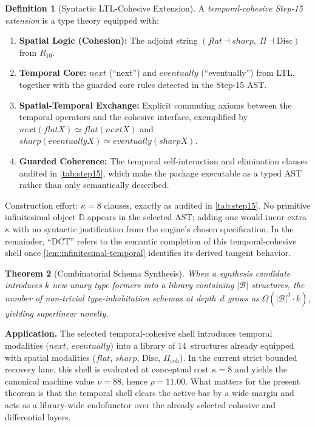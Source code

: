 \documentclass[11pt,a4paper]{article}
\def\flat{flat}%
\def\sharp{sharp}%
\def\bigcirc{next}%
\def\Diamond{eventually}%
\theoremstyle{plain}
\newtheorem{theorem}{Theorem}[section]
\theoremstyle{definition}
\newtheorem{definition}[theorem]{Definition}
\theoremstyle{remark}
\newcommand{\D}{\mathbb{D}}
\newcommand{\Disc}{\mathrm{Disc}}
\begin{document}
\begin{definition}[Syntactic LTL-Cohesive Extension]
\label{def:dct}
A \emph{temporal-cohesive Step-15 extension} is a type theory equipped with:
\begin{enumerate}[label=(\arabic*), nosep]
\item \textbf{Spatial Logic (Cohesion):} The adjoint string $(\flat \dashv \sharp,\; \Pi \dashv \Disc)$ from $R_{10}$.
\item \textbf{Temporal Core:} $\bigcirc$ (``next'') and $\Diamond$ (``eventually'') from LTL, together with the guarded core rules detected in the Step-15 AST.
\item \textbf{Spatial-Temporal Exchange:} Explicit commuting axioms between the temporal operators and the cohesive interface, exemplified by $\bigcirc(\flat X) \simeq \flat(\bigcirc X)$ and $\sharp(\Diamond X) \simeq \Diamond(\sharp X)$.
\item \textbf{Guarded Coherence:} The temporal self-interaction and elimination clauses audited in \cref{tab:step15}, which make the package executable as a typed AST rather than only semantically described.
\end{enumerate}
Construction effort: $\kappa = 8$ clauses, exactly as audited in \cref{tab:step15}.
No primitive infinitesimal object $\D$ appears in the selected AST; adding one would incur extra $\kappa$ with no syntactic justification from the engine's chosen specification.
In the remainder, ``DCT'' refers to the semantic completion of this temporal-cohesive shell once \cref{lem:infinitesimal-temporal} identifies its derived tangent behavior.
\end{definition}

\begin{theorem}[Combinatorial Schema Synthesis]
\label{thm:tensor}
When a synthesis candidate introduces $k$ new unary type formers into a library containing $|\mathcal{B}|$ structures, the number of non-trivial type-inhabitation schemas at depth~$d$ grows as $\Omega(|\mathcal{B}|^d \cdot k)$, yielding superlinear novelty.
\end{theorem}

\noindent \textbf{Application.}
The selected temporal-cohesive shell introduces temporal modalities ($\bigcirc$, $\Diamond$) into a library of 14~structures already equipped with spatial modalities ($\flat$, $\sharp$, $\Disc$, $\Pi_{\mathrm{coh}}$).
In the current strict bounded recovery lane, this shell is evaluated at conceptual cost $\kappa=8$ and yields the canonical machine value $\nu = 88$, hence $\rho = 11.00$.
What matters for the present theorem is that the temporal shell clears the active bar by a wide margin and acts as a library-wide endofunctor over the already selected cohesive and differential layers.
\end{document}
